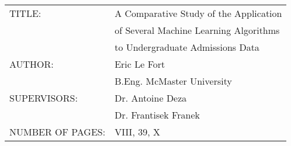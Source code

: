 \thispagestyle{plain}
\\
\vspace{4cm}
\begin{flushleft}
\begin{tabular}{l l}
	TITLE: 				&\hspace{3cm}A Comparative Study of the Application\\
	~					&\hspace{3cm}of Several Machine Learning Algorithms\\
						&\hspace{3cm}to Undergraduate Admissions Data\\
	AUTHOR: 			&\hspace{3cm}Eric Le Fort\\
	~					&\hspace{3cm}B.Eng. McMaster University\\
	SUPERVISORS: 		&\hspace{3cm}Dr. Antoine Deza\\
	~					&\hspace{3cm}Dr. Frantisek Franek\\
	NUMBER OF PAGES:	&\hspace{3cm}VIII, 39, X
\end{tabular} 
\end{flushleft}